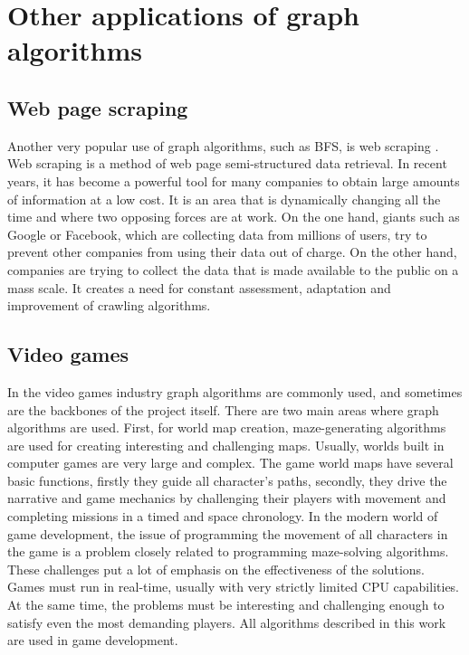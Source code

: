 \section{Other applications of graph algorithms}
\subsection{Web page scraping}
Another very popular use of graph algorithms, such as BFS, is web scraping \cite{24}. Web scraping is a method of web page semi-structured data retrieval. In recent years, it has become a powerful tool
for many companies to obtain large amounts of information at a low cost. It is an area that is dynamically changing all the time and where two opposing forces are at work. On the one hand,
giants such as Google or Facebook, which are collecting data from millions of users, try to prevent other companies from using their data out of charge. On the other hand, companies 
are trying to collect the data that is made available to the public on a mass scale. It creates a need for constant assessment, adaptation and improvement of crawling algorithms.
\subsection{Video games}
In the video games industry graph algorithms are commonly used, and sometimes are the backbones of the project itself. There are two main areas where graph algorithms are used. 
First, for world map creation, maze-generating algorithms are used for creating interesting and challenging maps. Usually, worlds built in computer games are very large and complex.
The game world maps have several basic functions, firstly they guide all character's paths, secondly, they drive the narrative and game mechanics by challenging their players with movement
and completing missions in a timed and space chronology. In the modern world of game development, the issue of programming the movement of all characters in 
the game is a problem closely related to programming maze-solving algorithms. These challenges put a lot of emphasis on the effectiveness of the solutions. 
Games must run in real-time, usually with very strictly limited CPU capabilities. At the same time, the problems must be interesting and challenging enough 
to satisfy even the most demanding players. All algorithms described in this work are used in game development.\cite{25}

